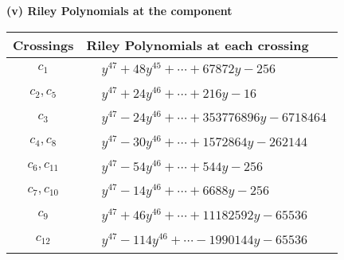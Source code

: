 \documentclass[1p]{elsarticle_modified}
\theoremstyle{definition}
\begin{document}
\newpage\renewcommand{\arraystretch}{1}
\flushleft \textbf{(v) Riley Polynomials at the component}\newline \\
\begin{tabular}{m{50pt}|m{274pt}}
Crossings & \hspace{64pt}Riley Polynomials at each crossing \\
\hline $$\begin{aligned}c_{1}\end{aligned}$$&$\begin{aligned}
&y^{47}+48 y^{45}+\cdots+67872 y-256
\end{aligned}$\\
\hline $$\begin{aligned}c_{2},c_{5}\end{aligned}$$&$\begin{aligned}
&y^{47}+24 y^{46}+\cdots+216 y-16
\end{aligned}$\\
\hline $$\begin{aligned}c_{3}\end{aligned}$$&$\begin{aligned}
&y^{47}-24 y^{46}+\cdots+353776896 y-6718464
\end{aligned}$\\
\hline $$\begin{aligned}c_{4},c_{8}\end{aligned}$$&$\begin{aligned}
&y^{47}-30 y^{46}+\cdots+1572864 y-262144
\end{aligned}$\\
\hline $$\begin{aligned}c_{6},c_{11}\end{aligned}$$&$\begin{aligned}
&y^{47}-54 y^{46}+\cdots+544 y-256
\end{aligned}$\\
\hline $$\begin{aligned}c_{7},c_{10}\end{aligned}$$&$\begin{aligned}
&y^{47}-14 y^{46}+\cdots+6688 y-256
\end{aligned}$\\
\hline $$\begin{aligned}c_{9}\end{aligned}$$&$\begin{aligned}
&y^{47}+46 y^{46}+\cdots+11182592 y-65536
\end{aligned}$\\
\hline $$\begin{aligned}c_{12}\end{aligned}$$&$\begin{aligned}
&y^{47}-114 y^{46}+\cdots-1990144 y-65536
\end{aligned}$\\
\hline
\end{tabular}\\~\\
\end{document}
